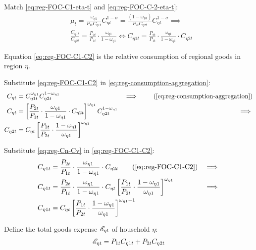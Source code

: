\documentclass[../thesis.tex]{subfiles}
\begin{document}
Match \ref{eq:reg-FOC-C1-eta-t} and \ref{eq:reg-FOC-C-2-eta-t}:
\begin{align}
	& \mu_t = \frac{\omega_{\eta 1}}{P_{1 t} C_{\eta 1 t}} C_{\eta t}^{1 -\sigma} = \frac{(1 -\omega_{\eta 1})}{P_{2 t} C_{\eta 2 t}} C_{\eta t}^{1 -\sigma} \implies \nonumber \\
	& \frac{C_{\eta 1 t}}{C_{\eta 2 t}} = \frac{P_{2 t}}{P_{1 t}} \cdot \frac{\omega_{\eta 1}}{1 -\omega_{\eta 1}} \iff C_{\eta 1 t} = \frac{P_{2 t}}{P_{1 t}} \cdot \frac{\omega_{\eta 1}}{1 -\omega_{\eta 1}} \cdot C_{\eta 2 t} \label{eq:reg-FOC-C1-C2}
\end{align}

Equation \ref{eq:reg-FOC-C1-C2} is the relative consumption of regional goods in region $\eta$.

Substitute \ref{eq:reg-FOC-C1-C2} in \ref{eq:reg-consumption-aggregation}:
\begin{alignat}{2}
	C_{\eta t} &= C_{\eta 1 t}^{\omega_{\eta 1}} C_{\eta 2 t}^{1-\omega_{\eta 1}} &\implies \tag{\ref{eq:reg-consumption-aggregation}} \\
	C_{\eta t} &= \left[ \frac{P_{2 t}}{P_{1 t}} \cdot \frac{\omega_{\eta 1}}{1 -\omega_{\eta 1}} \cdot C_{\eta 2 t} \right]^{\omega_{\eta 1}} C_{\eta 2 t}^{1-\omega_{\eta 1}} &\implies \nonumber \\
	C_{\eta 2 t} &= C_{\eta t} \left[ \frac{P_{1 t}}{P_{2 t}} \cdot \frac{1 -\omega_{\eta 1}}{\omega_{\eta 1}} \right]^{\omega_{\eta 1}} \label{eq:reg-Cn-Cv}
\end{alignat}

Substitute \ref{eq:reg-Cn-Cv} in \ref{eq:reg-FOC-C1-C2}:
\begin{alignat}{2}
	C_{\eta 1 t} &= \frac{P_{2 t}}{P_{1 t}} \cdot \frac{\omega_{\eta 1}}{1 -\omega_{\eta 1}} \cdot C_{\eta 2 t} \tag{\ref{eq:reg-FOC-C1-C2}} &\implies \nonumber \\
	C_{\eta 1 t} &= \frac{P_{2 t}}{P_{1 t}} \cdot \frac{\omega_{\eta 1}}{1 -\omega_{\eta 1}} \cdot C_{\eta t} \left[ \frac{P_{1 t}}{P_{2 t}} \cdot \frac{1 -\omega_{\eta 1}}{\omega_{\eta 1}} \right]^{\omega_{\eta 1}} &\implies \nonumber \\
	C_{\eta 1 t} &= C_{\eta t} \left[ \frac{P_{1 t}}{P_{2 t}} \cdot \frac{1 -\omega_{\eta 1}}{\omega_{\eta 1}} \right]^{\omega_{\eta 1} -1} \label{eq:reg-Cn-Cn}
\end{alignat}

Define the total goods expense ${\mathscr{E}_{\eta t}}$ of household $\eta$:
\begin{align}
	{\mathscr{E}_{\eta t}} = P_{1 t} C_{\eta 1 t} + P_{2 t} C_{\eta 2 t} \label{eq:reg-total-expense}
\end{align}
\end{document}
